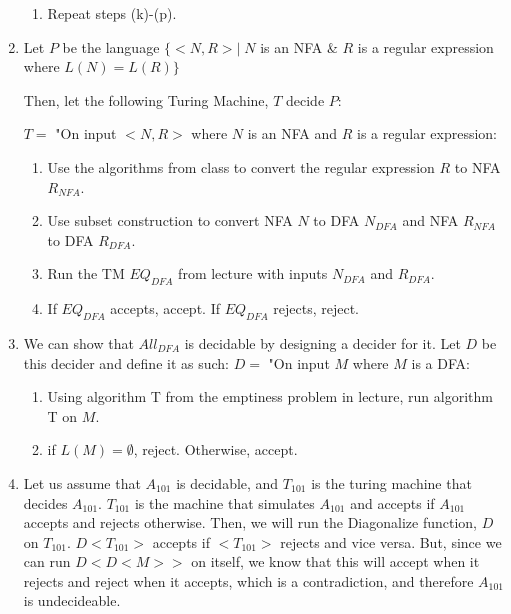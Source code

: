 \begin{enumerate}
\begin{enumerate}
        \item Repeat steps (k)-(p).
    \end{enumerate}
    \newpage

    \item Let $P$ be the language $\{<N, R> | \; N$ is an NFA \& $R$ is a regular expression where $L(N) = L(R)\}$

    Then, let the following Turing Machine, $T$ decide $P$:

    $T = $ "On input $<N,R>$ where $N$ is an NFA and $R$ is a regular expression:
    \begin{enumerate}
        \item Use the algorithms from class to convert the regular expression $R$ to NFA $R_{NFA}$.

        \item Use subset construction to convert NFA $N$ to DFA $N_{DFA}$ and NFA $R_{NFA}$ to DFA $R_{DFA}$.

        \item Run the TM $EQ_{DFA}$ from lecture with inputs $N_{DFA}$ and $R_{DFA}$.

        \item If $EQ_{DFA}$ accepts, accept. If $EQ_{DFA}$ rejects, reject.
    \end{enumerate}

    \item We can show that $All_{DFA}$ is decidable by designing a decider for it. Let $D$ be this decider and define it as such:
    $D = $ "On input $M$ where $M$ is a DFA:
    \begin{enumerate}
        \item Using algorithm T from the emptiness problem in lecture, run algorithm T on $M$.
        \item if $L(M) = \emptyset$, reject. Otherwise, accept.
    \end{enumerate}

    \item Let us assume that $A_{101}$ is decidable, and $T_{101}$ is the turing machine that decides $A_{101}$. $T_{101}$ is the machine that simulates $A_{101}$ and accepts if $A_{101}$ accepts and rejects otherwise. Then, we will run the Diagonalize function, $D$ on $T_{101}$. $D<T_{101}>$ accepts if $<T_{101}>$ rejects and vice versa. But, since we can run $D<D<M>>$ on itself, we know that this will accept when it rejects and reject when it accepts, which is a contradiction, and therefore $A_{101}$ is undecideable.
\end{enumerate}

